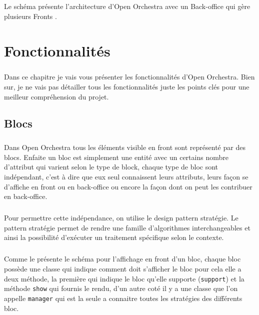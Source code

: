 	    \paragraph{}	
		Le schéma présente l'architecture d'Open Orchestra avec un \og Back-office \fg{} qui gère plusieurs \og Fronts \fg{}.
   
\chapter{Fonctionnalités}
	    \paragraph{}
	    Dans ce chapitre je vais vous présenter les fonctionnalités d'Open Orchestra. Bien sur, je ne vais pas détailler tous les fonctionnalités juste les points clés pour une meilleur compréhension du projet.
	      \section{Blocs}  
	       \paragraph{}
	      Dans Open Orchestra tous les éléments visible en front sont représenté par des blocs. Enfaite un bloc est simplement une entité avec un certains nombre d'attribut qui varient selon le type de block, chaque type de bloc sont indépendant, c'est à dire que eux seul connaissent leurs attributs, leurs façon se d'affiche en front ou en back-office ou encore la façon dont on peut les contribuer en back-office. 
	       \paragraph{}
	       Pour permettre cette indépendance, on utilise le design pattern stratégie. Le pattern stratégie permet de rendre une famille d'algorithmes interchangeables et ainsi la possibilité d'exécuter un traitement spécifique selon le contexte.

          \paragraph{}
	       Comme le présente le schéma  pour l'affichage en front d'un bloc, chaque bloc possède une classe qui indique comment doit s'afficher le bloc pour cela elle a deux méthode, la première qui indique le bloc qu'elle supporte (\verb?support?) et la méthode \verb?show? qui fournis le rendu, d'un autre coté il y a une classe que l'on appelle \verb?manager?  qui est la seule a connaitre toutes les stratégies des différents bloc. 

